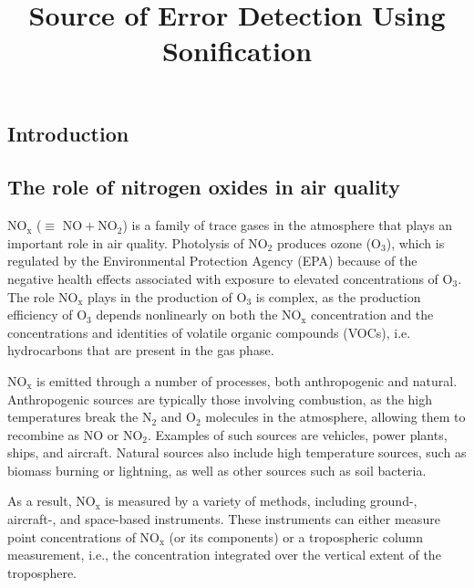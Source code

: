 \documentclass[a4paper,10pt,oneside]{article}
\title{Source of Error Detection Using Sonification}
\newcommand{\ce}[1]{$\mathrm{#1}$}
\begin{document}
\ninept
\maketitle

\begin{sloppy}

\begin{abstract}

\end{abstract}

\section{Introduction}
\label{sec:intro}

\subsection{The role of nitrogen oxides in air quality}

\ce{NO_x} ($\equiv$ \ce{NO + NO_2}) is a family of trace gases in the atmosphere that plays an important role in air quality.  Photolysis of \ce{NO_2} produces ozone (\ce{O_3}), which is regulated by the Environmental Protection Agency (EPA) because of the negative health effects associated with exposure to elevated concentrations of \ce{O_3}. The role \ce{NO_x} plays in the production of \ce{O_3} is complex, as the production efficiency of \ce{O_3} depends nonlinearly on both the \ce{NO_x} concentration and the concentrations and identities of volatile organic compounds (VOCs), i.e. hydrocarbons that are present in the gas phase.

\ce{NO_x} is emitted through a number of processes, both anthropogenic and natural. Anthropogenic sources are typically those involving combustion, as the high temperatures break the \ce{N_2} and \ce{O_2} molecules in the atmosphere, allowing them to recombine as \ce{NO} or \ce{NO_2}. Examples of such sources are vehicles, power plants, ships, and aircraft. Natural sources also include high temperature sources, such as biomass burning or lightning, as well as other sources such as soil bacteria.

As a result, \ce{NO_x} is measured by a variety of methods, including ground-, aircraft-, and space-based instruments. These instruments can either measure point concentrations of \ce{NO_x} (or its components) or a tropospheric column measurement, i.e., the concentration integrated over the vertical extent of the troposphere.


\end{sloppy}
\end{document}
